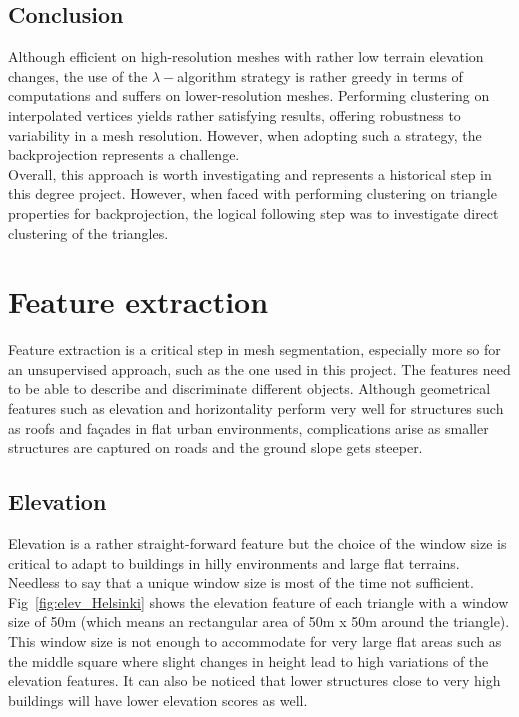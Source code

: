 \documentclass{kththesis}
\begin{document}
\subsection{Conclusion}
Although efficient on high-resolution meshes with rather low terrain elevation changes, the use of the $\lambda-$algorithm strategy is rather greedy in terms of computations and suffers on lower-resolution meshes. Performing clustering on interpolated vertices yields rather satisfying results, offering robustness to variability in a mesh resolution. However, when adopting such a strategy, the backprojection represents a challenge. \\
Overall, this approach is worth investigating and represents a historical step in this degree project. However, when faced with performing clustering on triangle properties for backprojection, the logical following step was to investigate direct clustering of the triangles. 

\section{Feature extraction}
Feature extraction is a critical step in mesh segmentation, especially more so for an unsupervised approach, such as the one used in this project. The features need to be able to describe and discriminate different objects. Although geometrical features such as elevation and horizontality perform very well for structures such as roofs and façades in flat urban environments, complications arise as smaller structures are captured on roads and the ground slope gets steeper.
\subsection{Elevation} 
Elevation is a rather straight-forward feature but the choice of the window size is critical to adapt to buildings in hilly environments and large flat terrains. Needless to say that a unique window size is most of the time not sufficient. \\
Fig~\ref{fig:elev_Helsinki} shows the elevation feature of each triangle with a window size of 50m (which means an rectangular area of 50m x 50m around the triangle). This window size is not enough to accommodate for very large flat areas such as the middle square where slight changes in height lead to high variations of the elevation features. It can also be noticed that lower structures close to very high buildings will have lower elevation scores as well. 
\end{document}
